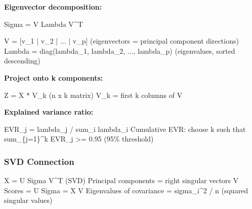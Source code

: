 \documentclass[11pt]{article}
\newenvironment{Shaded}{\begin{snugshade}}{\end{snugshade}}
\newcommand{\BuiltInTok}[1]{\textcolor[rgb]{0.50,0.55,0.55}{#1}}
\newcommand{\DecValTok}[1]{\textcolor[rgb]{0.96,0.45,0.00}{#1}}
\newcommand{\FloatTok}[1]{\textcolor[rgb]{0.96,0.45,0.00}{#1}}
\newcommand{\NormalTok}[1]{\textcolor[rgb]{0.81,0.81,0.76}{#1}}
\newcommand{\OperatorTok}[1]{\textcolor[rgb]{0.81,0.81,0.76}{#1}}
\begin{document}
\textbf{Eigenvector decomposition:}


\begin{Shaded}
\begin{Highlighting}[]
\NormalTok{Sigma }\OperatorTok{=}\NormalTok{ V Lambda V}\OperatorTok{\^{}}\NormalTok{T}

\NormalTok{V }\OperatorTok{=}\NormalTok{ [v\_1 }\OperatorTok{|}\NormalTok{ v\_2 }\OperatorTok{|}\NormalTok{ ... }\OperatorTok{|}\NormalTok{ v\_p]    (eigenvectors }\OperatorTok{=}\NormalTok{ principal component directions)}
\NormalTok{Lambda }\OperatorTok{=}\NormalTok{ diag(lambda\_1, lambda\_2, ..., lambda\_p)   (eigenvalues, }\BuiltInTok{sorted}\NormalTok{ descending)}
\end{Highlighting}
\end{Shaded}

\textbf{Project onto k components:}


\begin{Shaded}
\begin{Highlighting}[]
\NormalTok{Z }\OperatorTok{=}\NormalTok{ X }\OperatorTok{*}\NormalTok{ V\_k    (n x k matrix)}
\NormalTok{V\_k }\OperatorTok{=}\NormalTok{ first k columns of V}
\end{Highlighting}
\end{Shaded}

\textbf{Explained variance ratio:}


\begin{Shaded}
\begin{Highlighting}[]
\NormalTok{EVR\_j }\OperatorTok{=}\NormalTok{ lambda\_j }\OperatorTok{/}\NormalTok{ sum\_i lambda\_i}
\NormalTok{Cumulative EVR: choose k such that sum\_\{j}\OperatorTok{=}\DecValTok{1}\NormalTok{\}}\OperatorTok{\^{}}\NormalTok{k EVR\_j }\OperatorTok{\textgreater{}=} \FloatTok{0.95}\NormalTok{ (}\DecValTok{95}\OperatorTok{\%}\NormalTok{ threshold)}
\end{Highlighting}
\end{Shaded}

\subsubsection{SVD Connection}\label{svd-connection}


\begin{Shaded}
\begin{Highlighting}[]
\NormalTok{X }\OperatorTok{=}\NormalTok{ U Sigma V}\OperatorTok{\^{}}\NormalTok{T    (SVD)}
\NormalTok{Principal components }\OperatorTok{=}\NormalTok{ right singular vectors V}
\NormalTok{Scores }\OperatorTok{=}\NormalTok{ U Sigma }\OperatorTok{=}\NormalTok{ X V}
\NormalTok{Eigenvalues of covariance }\OperatorTok{=}\NormalTok{ sigma\_i}\OperatorTok{\^{}}\DecValTok{2} \OperatorTok{/}\NormalTok{ n (squared singular values)}
\end{Highlighting}
\end{Shaded}
\end{document}
